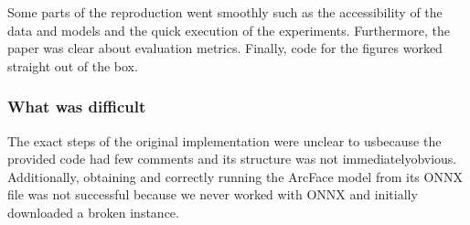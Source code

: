 

Some parts of the reproduction went smoothly such as the accessibility of the data and models and the quick execution of the experiments. Furthermore, the paper was clear about evaluation metrics. Finally, code for the figures worked straight out of the box.

\subsubsection*{What was difficult}



The exact steps of the original implementation were unclear to us\break{}because the provided code had few comments and its structure was not immediately\break{}obvious.
Additionally, obtaining and correctly running the ArcFace model from its ONNX file was not successful because we never worked with ONNX and initially downloaded a broken instance.


